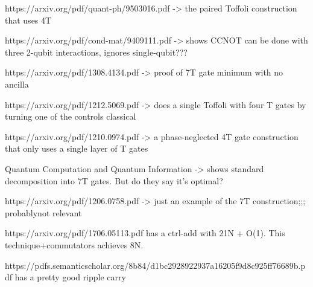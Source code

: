 \documentclass[twocolumn,longbibliography]{quantumarticle-customized}
\begin{document}
https://arxiv.org/pdf/quant-ph/9503016.pdf   ->   the paired Toffoli construction that uses 4T

https://arxiv.org/pdf/cond-mat/9409111.pdf   -> shows CCNOT can be done with three 2-qubit interactions, ignores single-qubit???


https://arxiv.org/pdf/1308.4134.pdf -> proof of 7T gate minimum with no ancilla

https://arxiv.org/pdf/1212.5069.pdf  ->   does a single Toffoli with four T gates by turning one of the controls classical

https://arxiv.org/pdf/1210.0974.pdf  ->   a phase-neglected 4T gate construction that only uses a single layer of T gates


Quantum Computation and Quantum Information -> shows standard decomposition into 7T gates. But do they say it's optimal?

https://arxiv.org/pdf/1206.0758.pdf -> just an example of the 7T construction;;; probablynot relevant



https://arxiv.org/pdf/1706.05113.pdf   has a ctrl-add with 21N + O(1). This technique+commutators achieves 8N.


https://pdfs.semanticscholar.org/8b84/d1bc2928922937a16205f9d8c925ff76689b.pdf     has a pretty good ripple carry
\end{document}
